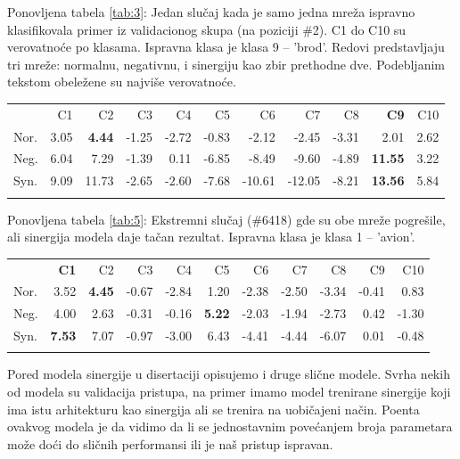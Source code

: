 \begin{table}
\centering
{Ponovljena tabela \ref{tab:3}: Jedan slučaj kada je samo jedna mreža ispravno klasifikovala primer iz validacionog skupa (na poziciji \#2). C1 do C10 su verovatnoće po klasama. Ispravna klasa je klasa 9 -- 'brod'. Redovi predstavljaju tri mreže: normalnu, negativnu, i sinergiju kao zbir prethodne dve. Podebljanim tekstom obeležene su najviše verovatnoće.}

\tabcolsep=0.04cm
\begin{tabular}{lrrrrrrrrrr}
\hline\noalign{\smallskip}
 & C1 & C2 & C3 & C4 & C5 & C6 & C7 & C8 & \textbf{C9} & C10 \\
\noalign{\smallskip}\hline\noalign{\smallskip}
Nor. & 3.05 & \textbf{4.44} & -1.25 & -2.72 & -0.83 & -2.12 & -2.45 & -3.31 & 2.01 & 2.62 \\
Neg. & 6.04 & 7.29 & -1.39 & 0.11 & -6.85 & -8.49 & -9.60 & -4.89 & \textbf{11.55} & 3.22 \\
Syn. & 9.09 & 11.73 & -2.65 & -2.60 & -7.68 & -10.61 & -12.05 & -8.21 & \textbf{13.56} & 5.84 \\
\noalign{\smallskip}\hline
\end{tabular}
\end{table}

\begin{table}
\centering
{Ponovljena tabela \ref{tab:5}: Ekstremni slučaj (\#6418) gde su obe mreže pogrešile, ali sinergija modela daje tačan rezultat. Ispravna klasa je klasa 1 -- 'avion'.}
\tabcolsep=0.06cm
\begin{tabular}{lrrrrrrrrrr}
\hline\noalign{\smallskip}
 & \textbf{C1} & C2 & C3 & C4 & C5 & C6 & C7 & C8 & C9 & C10 \\
\noalign{\smallskip}\hline\noalign{\smallskip}
Nor. & 3.52 & \textbf{4.45} & -0.67 & -2.84 & 1.20 & -2.38 & -2.50 & -3.34 & -0.41 & 0.83 \\
Neg. & 4.00 & 2.63 & -0.31 & -0.16 & \textbf{5.22} & -2.03 & -1.94 & -2.73 & 0.42 & -1.30 \\
Syn. & \textbf{7.53} & 7.07 & -0.97 & -3.00 & 6.43 & -4.41 & -4.44 & -6.07 & 0.01 & -0.48 \\
\noalign{\smallskip}\hline
\end{tabular}
\end{table}

Pored modela sinergije u disertaciji opisujemo i druge slične modele. Svrha nekih od modela su validacija pristupa, na primer imamo model trenirane sinergije koji ima istu arhitekturu kao sinergija ali se trenira na uobičajeni način. Poenta ovakvog modela je da vidimo da li se jednostavnim povećanjem broja parametara može doći do sličnih performansi ili je naš pristup ispravan.

